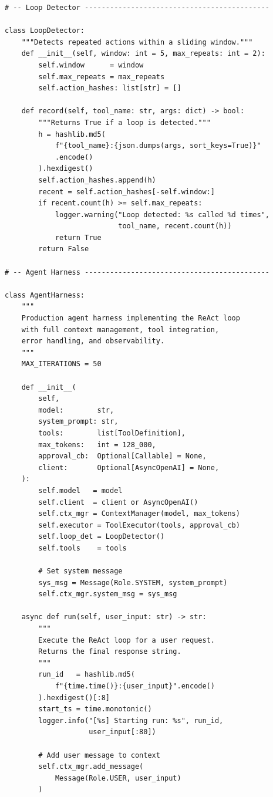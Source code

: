\begin{lstlisting}[style=pythonstyle, caption={Production Agent Harness -- Core Implementation}]
# -- Loop Detector --------------------------------------------

class LoopDetector:
    """Detects repeated actions within a sliding window."""
    def __init__(self, window: int = 5, max_repeats: int = 2):
        self.window      = window
        self.max_repeats = max_repeats
        self.action_hashes: list[str] = []

    def record(self, tool_name: str, args: dict) -> bool:
        """Returns True if a loop is detected."""
        h = hashlib.md5(
            f"{tool_name}:{json.dumps(args, sort_keys=True)}"
            .encode()
        ).hexdigest()
        self.action_hashes.append(h)
        recent = self.action_hashes[-self.window:]
        if recent.count(h) >= self.max_repeats:
            logger.warning("Loop detected: %s called %d times",
                           tool_name, recent.count(h))
            return True
        return False

# -- Agent Harness --------------------------------------------

class AgentHarness:
    """
    Production agent harness implementing the ReAct loop
    with full context management, tool integration,
    error handling, and observability.
    """
    MAX_ITERATIONS = 50

    def __init__(
        self,
        model:        str,
        system_prompt: str,
        tools:        list[ToolDefinition],
        max_tokens:   int = 128_000,
        approval_cb:  Optional[Callable] = None,
        client:       Optional[AsyncOpenAI] = None,
    ):
        self.model   = model
        self.client  = client or AsyncOpenAI()
        self.ctx_mgr = ContextManager(model, max_tokens)
        self.executor = ToolExecutor(tools, approval_cb)
        self.loop_det = LoopDetector()
        self.tools    = tools

        # Set system message
        sys_msg = Message(Role.SYSTEM, system_prompt)
        self.ctx_mgr.system_msg = sys_msg

    async def run(self, user_input: str) -> str:
        """
        Execute the ReAct loop for a user request.
        Returns the final response string.
        """
        run_id   = hashlib.md5(
            f"{time.time()}:{user_input}".encode()
        ).hexdigest()[:8]
        start_ts = time.monotonic()
        logger.info("[%s] Starting run: %s", run_id,
                    user_input[:80])

        # Add user message to context
        self.ctx_mgr.add_message(
            Message(Role.USER, user_input)
        )


\end{lstlisting}
